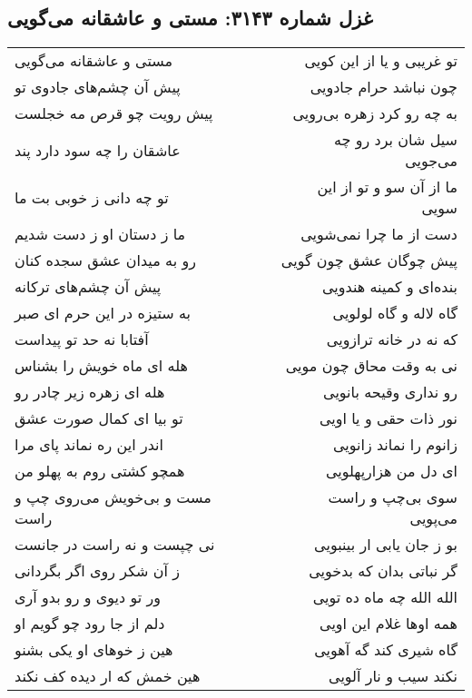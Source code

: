 \begin{center}
\section*{غزل شماره ۳۱۴۳: مستی و عاشقانه می‌گویی}
\label{sec:3143}
\begin{longtable}{l p{0.5cm} r}
مستی و عاشقانه می‌گویی
&&
تو غریبی و یا از این کویی
\\
پیش آن چشم‌های جادوی تو
&&
چون نباشد حرام جادویی
\\
پیش رویت چو قرص مه خجلست
&&
به چه رو کرد زهره بی‌رویی
\\
عاشقان را چه سود دارد پند
&&
سیل شان برد رو چه می‌جویی
\\
تو چه دانی ز خوبی بت ما
&&
ما از آن سو و تو از این سویی
\\
ما ز دستان او ز دست شدیم
&&
دست از ما چرا نمی‌شویی
\\
رو به میدان عشق سجده کنان
&&
پیش چوگان عشق چون گویی
\\
پیش آن چشم‌های ترکانه
&&
بنده‌ای و کمینه هندویی
\\
به ستیزه در این حرم ای صبر
&&
گاه لاله و گاه لولویی
\\
آفتابا نه حد تو پیداست
&&
که نه در خانه ترازویی
\\
هله ای ماه خویش را بشناس
&&
نی به وقت محاق چون مویی
\\
هله ای زهره زیر چادر رو
&&
رو نداری وقیحه بانویی
\\
تو بیا ای کمال صورت عشق
&&
نور ذات حقی و یا اویی
\\
اندر این ره نماند پای مرا
&&
زانوم را نماند زانویی
\\
همچو کشتی روم به پهلو من
&&
ای دل من هزارپهلویی
\\
مست و بی‌خویش می‌روی چپ و راست
&&
سوی بی‌چپ و راست می‌پویی
\\
نی چپست و نه راست در جانست
&&
بو ز جان یابی ار بینبویی
\\
ز آن شکر روی اگر بگردانی
&&
گر نباتی بدان که بدخویی
\\
ور تو دیوی و رو بدو آری
&&
الله الله چه ماه ده تویی
\\
دلم از جا رود چو گویم او
&&
همه اوها غلام این اویی
\\
هین ز خوهای او یکی بشنو
&&
گاه شیری کند گه آهویی
\\
هین خمش که ار دیده کف نکند
&&
نکند سیب و نار آلویی
\\
\end{longtable}
\end{center}
